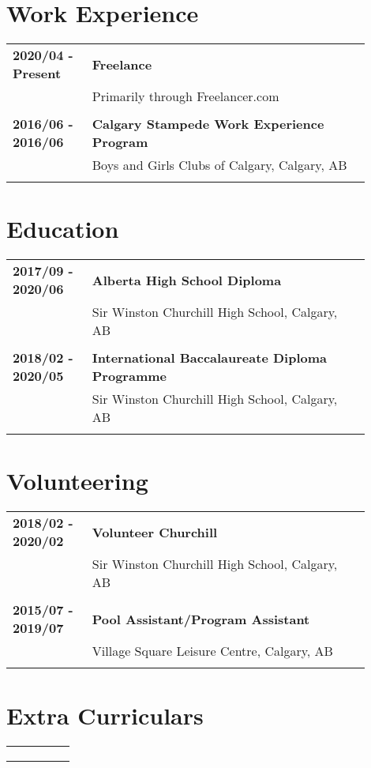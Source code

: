 \documentclass[letterpaper]{article}
\begin{document}
    \section*{Work Experience}
        \begin{tabular}{p{0.2\linewidth}p{0.7\linewidth}} 
            \textbf{2020/04 - Present} & \large\textbf{Freelance} \\
            & Primarily through Freelancer.com \\
            \\
            \textbf{2016/06 - 2016/06} & \large\textbf{Calgary Stampede Work Experience Program} \\
            & Boys and Girls Clubs of Calgary, Calgary, AB \\
            \\
        \end{tabular}

    \section*{Education}
        \begin{tabular}{p{0.2\linewidth}p{0.7\linewidth}} 
            \textbf{2017/09 - 2020/06} & \large\textbf{Alberta High School Diploma} \\
            & Sir Winston Churchill High School, Calgary, AB \\
            \\
            \textbf{2018/02 - 2020/05} & \large\textbf{International Baccalaureate Diploma Programme} \\
            & Sir Winston Churchill High School, Calgary, AB \\
            \\
        \end{tabular}

    \section*{Volunteering}
        \begin{tabular}{p{0.2\linewidth}p{0.7\linewidth}} 
            \textbf{2018/02 - 2020/02} & \large\textbf{Volunteer Churchill} \\
            & Sir Winston Churchill High School, Calgary, AB \\
            \\
            \textbf{2015/07 - 2019/07} & \large\textbf{Pool Assistant/Program Assistant} \\
            & Village Square Leisure Centre, Calgary, AB \\
            \\
        \end{tabular}

    \section*{Extra Curriculars}
        \begin{tabular}{p{0.2\linewidth}p{0.7\linewidth}} 
            \textbf{} & \large\textbf{} \\
            & \\
            \\
        \end{tabular}
\end{document}
